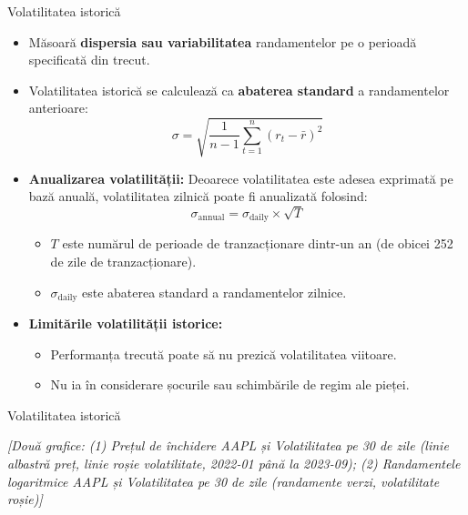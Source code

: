 \documentclass[9pt, aspectratio=169, t]{beamer}
\theoremstyle{definition}
\begin{document}
\begin{frame}{Volatilitatea istorică}
\begin{itemize}
    \item Măsoară \textbf{dispersia sau variabilitatea} randamentelor pe o perioadă specificată din trecut.
    \item Volatilitatea istorică se calculează ca \textbf{abaterea standard} a randamentelor anterioare:
    \[
    \sigma = \sqrt{\frac{1}{n-1}\sum_{t=1}^{n}(r_t - \bar{r})^2}
    \]
    \item \textbf{Anualizarea volatilității:} Deoarece volatilitatea este adesea exprimată pe bază anuală, volatilitatea zilnică poate fi anualizată folosind:
    \[
    \sigma_{\text{annual}} = \sigma_{\text{daily}} \times \sqrt{T}
    \]
    \begin{itemize}
        \item $T$ este numărul de perioade de tranzacționare dintr-un an (de obicei 252 de zile de tranzacționare).
        \item $\sigma_{\text{daily}}$ este abaterea standard a randamentelor zilnice.
    \end{itemize}
    \item \textbf{Limitările volatilității istorice:}
    \begin{itemize}
        \item Performanța trecută poate să nu prezică volatilitatea viitoare.
        \item Nu ia în considerare șocurile sau schimbările de regim ale pieței.
    \end{itemize}
\end{itemize}
\end{frame}

\begin{frame}{Volatilitatea istorică}
\begin{center}
    {\small\textit{[Două grafice: (1) Prețul de închidere AAPL și Volatilitatea pe 30 de zile (linie albastră preț, linie roșie volatilitate, 2022-01 până la 2023-09); (2) Randamentele logaritmice AAPL și Volatilitatea pe 30 de zile (randamente verzi, volatilitate roșie)]}}
\end{center}
\end{frame}
\end{document}
